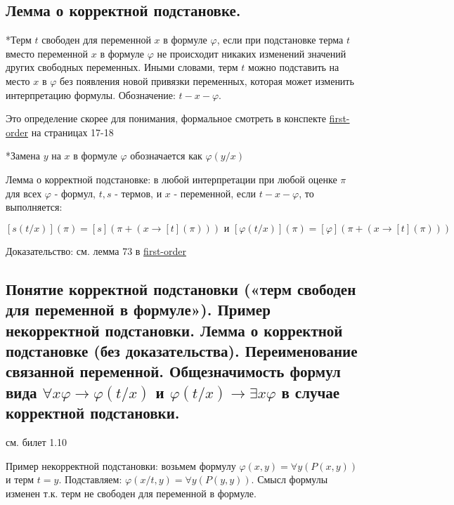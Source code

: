 \documentclass[a4paper, 10pt]{article}
\begin{document}
\subsection{Лемма о корректной подстановке.}

*Терм $t$ свободен для переменной $x$ в формуле $\varphi$, если при подстановке терма $t$ вместо переменной $x$ в формуле $\varphi$ не происходит никаких изменений значений других свободных переменных. Иными словами, терм $t$ можно подставить на место $x$ в $\varphi$ без появления новой привязки переменных, которая может изменить интерпретацию формулы. Обозначение: $t-x-\varphi$.

Это определение скорее для понимания, формальное смотреть в конспекте \href{https://drive.google.com/file/d/1V3QNOfANqZbiacI0d_2aLy8l1gZP0rTc/view}{first-order} на страницах 17-18

*Замена $y$ на $x$ в формуле $\varphi$ обозначается как $\varphi(y/x)$

\hfill

Лемма о корректной подстановке: в любой интерпретации при любой оценке $\pi$ для всех $\varphi$ - формул, $t,s$ - термов, и $x$ - переменной, если $t-x-\varphi$, то выполняется:

$$ [s(t/x)](\pi) = [s](\pi + (x \to [t](\pi))) \text{ и } [\varphi(t/x)](\pi)=[\varphi](\pi + (x\to [t](\pi))) $$

Доказательство: см. лемма 73 в 
\href{https://drive.google.com/file/d/1V3QNOfANqZbiacI0d_2aLy8l1gZP0rTc/view}{first-order}

\subsection{Понятие корректной подстановки («терм свободен для переменной в формуле»). Пример некорректной подстановки. Лемма о корректной подстановке (без доказательства). Переименование связанной переменной. Общезначимость формул вида $\forall x\varphi \to \varphi(t/x)$ и $\varphi(t/x) \to \exists x \varphi$ в случае корректной подстановки.}

см. билет 1.10

Пример некорректной подстановки: возьмем формулу $\varphi(x,y)=\forall y (P(x,y))$ и терм $t=y$. Подставляем: $\varphi(x/t,y)=\forall y (P(y,y))$. Смысл формулы изменен т.к. терм не свободен для переменной в формуле.
\end{document}
